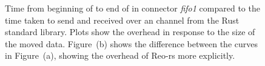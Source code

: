 \begin{figure}
	\centering
	\caption[Performance of fifo1 connector vs.\ a standard channel type.]{Time from beginning of  to end of  in connector \textit{fifo1} compared to the time taken to send and received over an  channel from the Rust standard library. Plots show the overhead in response to the size of the moved data. Figure~(b) shows the difference between the curves in Figure~(a), showing the overhead of Reo-rs more explicitly.}
	\label{fig:exper_rtt}
\end{figure}


